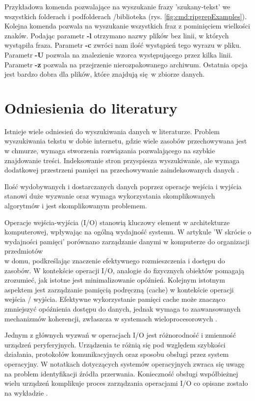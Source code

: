 Przykładowa komenda pozwalające na wyszukanie frazy 'szukany-tekst' we wszystkich
folderach i podfolderach /biblioteka (rys. \ref{fig:cmd:ripgrepExamples}). Kolejna
komenda pozwala na wyszukanie wszystkich fraz z pominięciem wielkości znaków. 
Podając parametr \textbf{-l} otrzymano nazwy plików bez linii, w których 
wystąpiła fraza. Parametr \textbf{-c} zwróci nam ilość wystąpień tego wyrazu w 
pliku. Parametr \textbf{-U} pozwala na znalezienie wzorca występującego przez 
kilka linii. Parametr \textbf{-z} pozwala na przejrzenie nierozpakowanego 
archiwum. Ostatnia opcja jest bardzo dobra dla plików, które znajdują się w 
zbiorze danych.

\section{Odniesienia do literatury}

Istnieje wiele odniesień do wyszukiwania danych w literaturze. Problem wyszukiwania tekstu 
w dobie internetu, gdzie wiele zasobów przechowywana jest w chmurze,
wymaga stworzenia rozwiązania pozwalającego na szybkie znajdowanie treści.
Indeksowanie stron przyspiesza wyszukiwanie, ale wymaga dodatkowej przestrzeni
pamięci na przechowywanie zaindeksowanych danych \cite{bib:internet:htmlSearchGoogle}.

Ilość wydobywanych i dostarczanych danych poprzez operacje wejścia i wyjścia stanowi duże wyzwanie
oraz wymaga wykorzystania skomplikowanych algorytmów i jest skomplikowanym
problemem. 

Operacje wejścia-wyjścia (I/O) stanowią kluczowy element w architekturze 
komputerowej, wpływając na ogólną wydajność systemu. W artykule 'W skrócie o 
wydajności pamięci' porównano zarządzanie danymi w komputerze do 
organizacji przedmiotów \\ w domu, podkreślając znaczenie efektywnego 
rozmieszczenia i dostępu do zasobów. W kontekście operacji I/O, analogie do 
fizycznych obiektów pomagają zrozumieć, jak istotne jest minimalizowanie 
opóźnień. Kolejnym istotnym aspektem jest zarządzanie pamięcią podręczną (cache) w 
kontekście operacji wejścia / wyjścia. Efektywne wykorzystanie pamięci cache może znacząco 
zmniejszyć opóźnienia dostępu do danych, jednak wymaga to zaawansowanych 
mechanizmów koherencji, zwłaszcza w systemach wieloprocesorowych \cite{bib:internet:IntelMemoryPerformance}. 

Jednym z głównych wyzwań w operacjach I/O jest różnorodność i zmienność 
urządzeń peryferyjnych. Urządzenia te różnią się pod względem szybkości 
działania, protokołów komunikacyjnych oraz sposobu obsługi przez system 
operacyjny. W notatkach dotyczących systemów operacyjnych zwraca się uwagę na 
problem identyfikacji źródła przerwania. Konieczność obsługi współbieżnej 
wielu urządzeń komplikuje proces zarządzania operacjami I/O co opisane
zostało na wykładzie \cite{bib:internet:UrzadzeniaWejsciaWyjscia}. 

